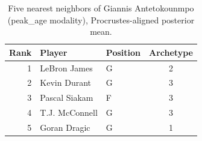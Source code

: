 \begin{table}[htbp]
  \centering\small
  \begin{tabular}{rllc}
    \toprule
    Rank & Player & Position & Archetype \\
    \midrule
    1 & LeBron James & G & 2 \\
    2 & Kevin Durant & G & 3 \\
    3 & Pascal Siakam & F & 3 \\
    4 & T.J. McConnell & G & 3 \\
    5 & Goran Dragic & G & 1 \\
    \bottomrule
  \end{tabular}
  \caption{Five nearest neighbors of Giannis Antetokounmpo (peak_age modality), Procrustes-aligned posterior mean.}
  \label{tab:Giannis_Antetokounmpo_neighbors_peak_age}
\end{table}

